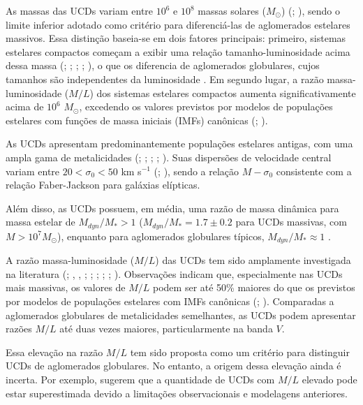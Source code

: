 As massas das UCDs variam entre $10^6$ e $10^8$ massas solares ($M_{\odot}$) (\citealp{Mieske_2008_1}; \citealp{Misgeld_2011_2}), sendo o limite inferior adotado como critério para diferenciá-las de aglomerados estelares massivos. Essa distinção baseia-se em dois fatores principais: primeiro, sistemas estelares compactos começam a exibir uma relação tamanho-luminosidade acima dessa massa (\citealp{Hasegan_2005}; \citealp{Cote_2006}; \citealp{Rejkuba_2007}; \citealp{Evstigneeva_2008}; \citealp{Norris_2011}), o que os diferencia de aglomerados globulares, cujos tamanhos são independentes da luminosidade \citep{Jornan_2005}. Em segundo lugar, a razão massa-luminosidade ($M/L$) dos sistemas estelares compactos aumenta significativamente acima de $10^6$ $M_{\odot}$, excedendo os valores previstos por modelos de populações estelares com funções de massa iniciais (IMFs) canônicas (\citealp{Hasegan_2005}; \citealp{Dabringhausen_2008}).

As UCDs apresentam predominantemente populações estelares antigas, com uma ampla gama de metalicidades (\citealp{Evstigneeva_2009}; \citealp{Janz_2015}; \citealp{Zhang_2018}; \citealp{Forbes_2020}; \citealp{Fahrion_2020}). Suas dispersões de velocidade central variam entre $20 < \sigma_0 < 50$ km s$^{-1}$ (\citealp{Hasegan_2005}; \citealp{Mieske_2008_1}), sendo a relação $M-\sigma_0$ consistente com a relação Faber-Jackson para galáxias elípticas.

Além disso, as UCDs possuem, em média, uma razão de massa dinâmica para massa estelar de $M_{dyn}/M_* > 1$ ($M_{dyn}/M_* = 1.7 \pm 0.2$ para UCDs massivas, com $M > 10^7 M_{\odot}$), enquanto para aglomerados globulares típicos, $M_{dyn}/M_* \approx 1$ \citep{Mieske_2013}.

A razão massa-luminosidade ($M/L$) das UCDs tem sido amplamente investigada na literatura (\citealp{Hasegan_2005}; \citealp{Dabringhausen_2009}, \citeyear{Dabringhausen_2010}, \citeyear{Dabringhausen_2012}; \citealp{Baumgardt_2008}; \citealp{Mieske_2008_2}; \citealp{Taylor_2010}; \citealp{Frank_2011}; \citealp{Strader_2013}). Observações indicam que, especialmente nas UCDs mais massivas, os valores de $M/L$ podem ser até 50\% maiores do que os previstos por modelos de populações estelares com IMFs canônicas (\citealp{Hasegan_2005}; \citealp{Mieske_2008_2}). Comparadas a aglomerados globulares de metalicidades semelhantes, as UCDs podem apresentar razões $M/L$ até duas vezes maiores, particularmente na banda $V$.

Essa elevação na razão $M/L$ tem sido proposta como um critério para distinguir UCDs de aglomerados globulares. No entanto, a origem dessa elevação ainda é incerta. Por exemplo, \cite{Voggel_2018} sugerem que a quantidade de UCDs com $M/L$ elevado pode estar superestimada devido a limitações observacionais e modelagens anteriores.

